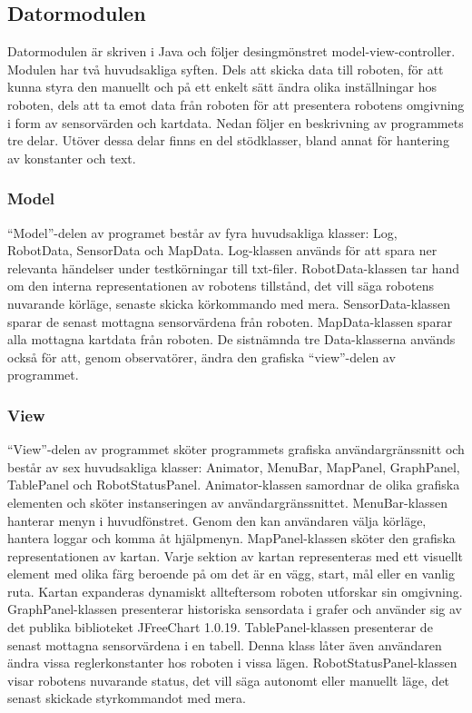 \documentclass[11pt]{article}
\begin{document}
\begin{flushleft}
\subsection{Datormodulen}
Datormodulen är skriven i Java och följer desingmönstret model-view-controller. Modulen har två huvudsakliga syften. Dels att skicka data till roboten, för att kunna styra den manuellt och på ett enkelt sätt ändra olika inställningar hos roboten, dels att ta emot data från roboten för att presentera robotens omgivning i form av sensorvärden och kartdata. Nedan följer en beskrivning av programmets tre delar. Utöver dessa delar finns en del stödklasser, bland annat för hantering av konstanter och text.%

\subsubsection{Model}
``Model''-delen av programet består av fyra huvudsakliga klasser: Log, RobotData, SensorData och MapData. 
Log-klassen används för att spara ner relevanta händelser under testkörningar till txt-filer. 
RobotData-klassen tar hand om den interna representationen av robotens tillstånd, det vill säga robotens nuvarande körläge, senaste skicka körkommando med mera. 
SensorData-klassen sparar de senast mottagna sensorvärdena från roboten. 
MapData-klassen sparar alla mottagna kartdata från roboten. De sistnämnda tre Data-klasserna används också för att, genom observatörer, ändra den grafiska ``view''-delen av programmet.

\subsubsection{View}
``View''-delen av programmet sköter programmets grafiska användargränssnitt och består av sex huvudsakliga klasser: Animator, MenuBar, MapPanel, GraphPanel, TablePanel och RobotStatusPanel. Animator-klassen samordnar de olika grafiska elementen och sköter instanseringen av användargränssnittet. 
MenuBar-klassen hanterar menyn i huvudfönstret. Genom den kan användaren välja körläge, hantera loggar och komma åt hjälpmenyn. 
MapPanel-klassen sköter den grafiska representationen av kartan. Varje sektion av kartan representeras med ett visuellt element med olika färg beroende på om det är en vägg, start, mål eller en vanlig ruta. Kartan expanderas dynamiskt allteftersom roboten utforskar sin omgivning. 
GraphPanel-klassen presenterar historiska sensordata i grafer och använder sig av det publika biblioteket JFreeChart 1.0.19. 
TablePanel-klassen presenterar de senast mottagna sensorvärdena i en tabell. Denna klass låter även användaren ändra vissa reglerkonstanter hos roboten i vissa lägen.
RobotStatusPanel-klassen visar robotens nuvarande status, det vill säga autonomt eller manuellt läge, det senast skickade styrkommandot med mera.


\end{flushleft}
\end{document}
